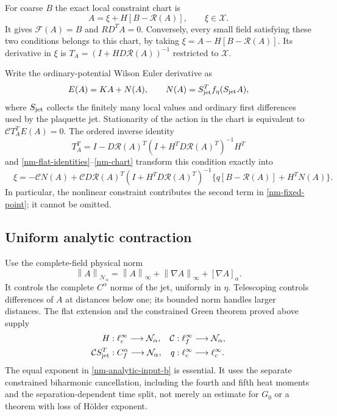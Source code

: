\documentclass[11pt]{article}
\theoremstyle{remark}
\newcommand{\norm}[1]{\left\|#1\right\|}
\begin{document}
For coarse $B$ the exact local constraint chart is
\begin{equation}\label{nm-chart}
 A=\xi+H[B-\mathcal R(A)],\qquad \xi\in\mathcal X.
\end{equation}
It gives $\mathcal F(A)=B$ and $RD^TA=0$. Conversely, every small
field satisfying these two conditions belongs to this chart,
by taking $\xi=A-H[B-\mathcal R(A)]$. Its derivative in $\xi$ is
$T_A=(I+HD\mathcal R(A))^{-1}$ restricted to $\mathcal X$.

Write the ordinary-potential Wilson Euler derivative as
\begin{equation}\label{nm-force}
 E(A)=KA+N(A),\qquad N(A)=S_{\rm jet}^Tf_\eta(S_{\rm jet}A),
\end{equation}
where $S_{\rm jet}$ collects the finitely many local values and
ordinary first differences used by the plaquette jet. Stationarity
of the action in the chart is equivalent to
$\mathcal C T_A^TE(A)=0$. The ordered inverse identity
\[
 T_A^T=I-D\mathcal R(A)^T
       (I+H^TD\mathcal R(A)^T)^{-1}H^T
\]
and \eqref{nm-flat-identities}--\eqref{nm-chart} transform this
condition exactly into
\begin{equation}\label{nm-fixed-point}
 \boxed{\quad
 \xi=-\mathcal C N(A)
 +\mathcal C D\mathcal R(A)^T
       (I+H^TD\mathcal R(A)^T)^{-1}
       \{q[B-\mathcal R(A)]+H^TN(A)\}.
 \quad}
\end{equation}
In particular, the nonlinear constraint contributes the second
term in \eqref{nm-fixed-point}; it cannot be omitted.

\subsection{Uniform analytic contraction}
\label{nm-contraction}

Use the complete-field physical norm
\begin{equation}\label{nm-norm}
 \norm{A}_{\mathcal N_\alpha}
 =\norm{A}_\infty+\norm{\nabla A}_\infty+[\nabla A]_\alpha.
\end{equation}
It controls the complete $C^\alpha$ norms of the jet, uniformly in
$\eta$. Telescoping controls differences of $A$ at distances below
one; its bounded norm handles larger distances. The flat extension
and the constrained Green theorem proved above supply
\begin{align}
 H &: \ell^\infty_c\longrightarrow\mathcal N_\alpha,&
 \mathcal C &: \ell^\infty_f\longrightarrow\mathcal N_\alpha,
                                                        \label{nm-analytic-input-a}\\
 \mathcal C S_{\rm jet}^T &: C^\alpha_f\longrightarrow\mathcal N_\alpha,
 &q &: \ell^\infty_c\longrightarrow\ell^\infty_c.
                                                        \label{nm-analytic-input-b}
\end{align}
The equal exponent in \eqref{nm-analytic-input-b} is essential.
It uses the separate constrained biharmonic cancellation, including
the fourth and fifth heat moments and the separation-dependent
time split, not merely an estimate for $G_0$ or a theorem with
loss of H\"older exponent.
\end{document}
